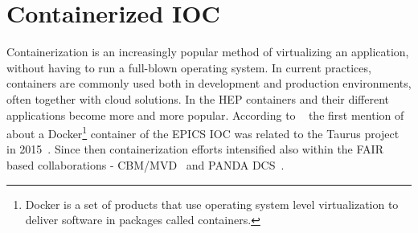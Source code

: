 \section{Containerized IOC}
Containerization is an increasingly popular method of virtualizing an application, without having to run a full-blown operating system. In current practices, containers are commonly used both in development and production environments, often together with cloud solutions. In the \gls{HEP} containers and their different applications become more and more popular. According to ~\cite{Klaus2021} the first mention of about a Docker\footnote{Docker is a set of products that use operating system level virtualization to deliver software in packages called containers.} container of the \gls{EPICS} \gls{IOC} was related to the Taurus project in 2015~\cite{taurus}. Since then containerization efforts intensified also within the \gls{FAIR} based collaborations - \gls{CBM}/\gls{MVD}~\cite{Klaus2021} and PANDA DCS~\cite{PANDA_1}.

